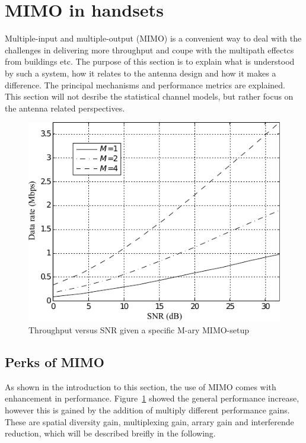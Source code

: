 \section{MIMO in handsets} %
\label{sec:mimo_in_handsets}
Multiple-input and multiple-output (MIMO) is a convenient way to deal with the challenges in delivering more throughput and coupe with the multipath effectcs from buildings etc. The purpose of this section is to explain what is understood by such a system, how it relates to the antenna design and how it makes a difference. The principal mechanisms and performance metrics are explained. This section will not desribe the statistical channel models, but rather focus on the antenna related perspectives. 

\begin{figure}[htbp]
  \centering
  \includegraphics[scale=1.2]{img/analysis/datarateMimo}
  \caption{Throughput versus SNR given a specific M-ary MIMO-setup\cite{Ezio2007MIMO}}
  \label{fig:mimo-throughput}
\end{figure}

\subsection{Perks of MIMO} 
As shown in the introduction to this section, the use of MIMO comes with enhancement in performance. Figure~\ref{fig:mimo-throughput} showed the general performance increase, however this is gained by the addition of multiply different performance gains. These are spatial diversity gain, multiplexing gain, arrary gain and interferende reduction\cite{Ezio2007MIMO}, which will be described breifly in the following.


